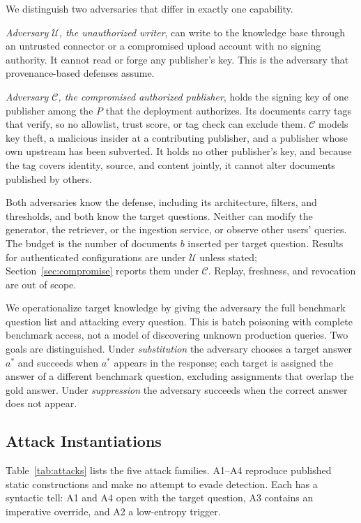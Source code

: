 \documentclass[lettersize,journal]{IEEEtran}
\newcommand{\AdvU}{\mathcal{U}}
\newcommand{\AdvC}{\mathcal{C}}
\begin{document}
We distinguish two adversaries that differ in exactly one capability.

\emph{Adversary $\AdvU$, the unauthorized writer}, can write to the knowledge base through an
untrusted connector or a compromised upload account with no signing authority. It cannot read
or forge any publisher's key. This is the adversary that provenance-based defenses assume.

\emph{Adversary $\AdvC$, the compromised authorized publisher}, holds the signing key of one
publisher among the $P$ that the deployment authorizes. Its documents carry tags that verify,
so no allowlist, trust score, or tag check can exclude them. $\AdvC$ models key theft, a
malicious insider at a contributing publisher, and a publisher whose own upstream has been
subverted. It holds no other publisher's key, and because the tag covers identity, source, and
content jointly, it cannot alter documents published by others.

Both adversaries know the defense, including its architecture, filters, and thresholds, and
both know the target questions. Neither can modify the generator, the retriever, or the
ingestion service, or observe other users' queries. The budget is the number of documents $b$
inserted per target question. Results for authenticated configurations are under $\AdvU$
unless stated; Section~\ref{sec:compromise} reports them under $\AdvC$. Replay, freshness, and
revocation are out of scope.

We operationalize target knowledge by giving the adversary the full benchmark question list
and attacking every question. This is batch poisoning with complete benchmark access, not a
model of discovering unknown production queries. Two goals are distinguished. Under
\emph{substitution} the adversary chooses a target answer $a^{*}$ and succeeds when $a^{*}$
appears in the response; each target is assigned the answer of a different benchmark question,
excluding assignments that overlap the gold answer. Under \emph{suppression} the adversary
succeeds when the correct answer does not appear.

\subsection{Attack Instantiations}
\label{sec:adaptive}

Table~\ref{tab:attacks} lists the five attack families. A1--A4 reproduce published static
constructions and make no attempt to evade detection. Each has a syntactic tell: A1 and A4
open with the target question, A3 contains an imperative override, and A2 a low-entropy
trigger.
\end{document}
